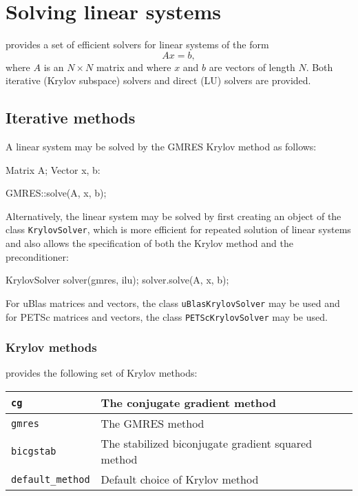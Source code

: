 \section{Solving linear systems}

\dolfin{} provides a set of efficient solvers for linear systems of
the form
\begin{equation}
  Ax = b,
\end{equation}
where $A$ is an $N\times N$ matrix and where $x$ and $b$ are vectors
of length $N$. Both iterative (Krylov subspace) solvers and direct
(LU) solvers are provided.

\subsection{Iterative methods}

A linear system may be solved by the GMRES Krylov method as follows:
\begin{code}
  Matrix A;
  Vector x, b:

  GMRES::solve(A, x, b);
\end{code}
Alternatively, the linear system may be solved by first creating an
object of the class \texttt{KrylovSolver}, which is more efficient for
repeated solution of linear systems and also allows the specification
of both the Krylov method and the preconditioner:
\begin{code}
  KrylovSolver solver(gmres, ilu);
  solver.solve(A, x, b);
\end{code}

For uBlas matrices and vectors, the class \texttt{uBlasKrylovSolver}
may be used and for PETSc matrices and vectors, the class
\texttt{PETScKrylovSolver} may be used.

\subsubsection{Krylov methods}

\dolfin{} provides the following set of Krylov methods:

\begin{center}
\begin{tabular}{|l|l|}
\hline
\texttt{cg}              & The conjugate gradient method \\
\hline
\texttt{gmres}           & The GMRES method \\
\hline
\texttt{bicgstab}        & The stabilized biconjugate gradient squared
method \\
\hline
\texttt{default\_method} & Default choice of Krylov method \\
\hline
\end{tabular}
\end{center}


